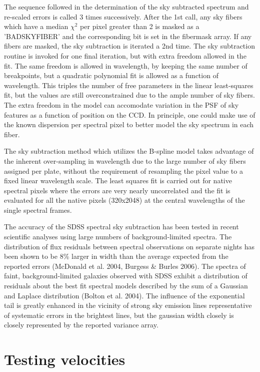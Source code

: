 \documentclass[12pt,preprint]{aastex}
\begin{document}
The sequence followed in the determination of the sky subtracted spectrum
and re-scaled errors is called 3 times successively.  After the 1st call,
any sky fibers which have a median $\chi^2$ per pixel greater than 2 is 
masked as a 'BADSKYFIBER' and the corresponding bit is set in the fibermask
array.  If any fibers are masked, the sky subtraction is iterated a 2nd time.
The sky subtraction routine is invoked for one final iteration, but with extra 
freedom allowed in the fit.  The same freedom is allowed in wavelength, by
keeping the same number of breakpoints, but a quadratic polynomial fit is
allowed as a function of wavelength.  This triples the number of free 
parameters in the linear least-squares fit, but the values are still 
overconstrained due to the ample number of sky fibers.  The extra freedom
in the model can accomodate variation in the PSF of sky features as a function 
of position on the CCD.  In principle, one could make use of the known 
dispersion per spectral pixel to better model the sky spectrum
in each fiber.

The sky subtraction method which utilizes the B-spline model takes advantage 
of the inherent over-sampling in wavelength due to the large number of 
sky fibers assigned per plate, without the requirement of resampling the 
pixel value to a fixed linear wavelength scale.  The least squares fit
is carried out for native spectral pixels where the errors are very nearly 
uncorrelated and the fit is evaluated for all the native pixels (320x2048)  
at the central wavelengths of the single spectral frames.
    
The accuracy of the SDSS spectral sky subtraction has been tested in recent
scientific analyses using large numbers of background-limited spectra.   
The distribution of flux residuals between spectral observations 
on separate nights has been shown to be 8\% larger in width than the average expected
from the reported errors (McDonald et al. 2004, Burgess \& Burles 2006).
The spectra of faint, background-limited galaxies observed with SDSS exhibit a 
distribution of residuals about the best fit spectral models described by the 
sum of a
Gaussian and Laplace distribution (Bolton et al. 2004).  
The influence of the exponential tail is greatly enhanced in the vicinity of strong sky 
emission lines representative of systematic errors in the brightest lines, but the gaussian 
width closely is closely represented by the reported variance array.


\section{Testing velocities}
\end{document}
